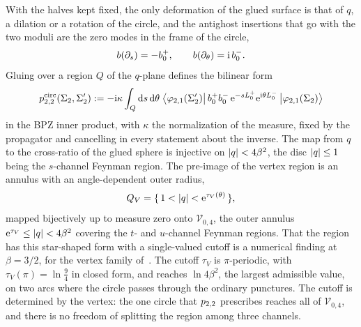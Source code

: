 With the halves kept fixed, the only deformation of the glued surface is that of $q$, a dilation or a rotation of the circle, and the antighost insertions that go with the two moduli are the zero modes in the frame of the circle,
\begin{equation}
  \label{p:eq:ws:schiffer}
  b(\partial_s)
    = - b_0^+,
  \qquad
  b(\partial_\theta)
    = \mathrm{i} \, b_0^-.
\end{equation}
Gluing over a region $Q$ of the $q$-plane defines the bilinear form
\begin{equation}
  \label{p:eq:ws:p-circ}
  p_{2,2}^{\mathrm{circ}}(\Sigma_2, \Sigma_2')
    := - \mathrm{i} \kappa \int_Q \mathrm{d} s \, \mathrm{d}\theta \;
      \big\langle \varphi_{2,1}(\Sigma_2') \big| \, b_0^+ b_0^- \, \mathrm{e}^{- s L_0^+} \mathrm{e}^{\mathrm{i} \theta L_0^-} \, \big| \varphi_{2,1}(\Sigma_2) \big\rangle
\end{equation}
in the BPZ inner product, with $\kappa$ the normalization of the measure, fixed by the propagator and cancelling in every statement about the inverse.
The map from $q$ to the cross-ratio of the glued sphere is injective on ${|q|} < 4 \beta^2$, the disc ${|q|} \le 1$ being the $s$-channel Feynman region.
The pre-image of the vertex region is an annulus with an angle-dependent outer radius,
\begin{equation}
  \label{p:eq:ws:region}
  Q_V
    = \{\, 1 < {|q|} < \mathrm{e}^{\tau_V(\theta)} \,\},
\end{equation}
mapped bijectively up to measure zero onto $\mathcal V_{0,4}$, the outer annulus $\mathrm{e}^{\tau_V} \le {|q|} < 4 \beta^2$ covering the $t$- and $u$-channel Feynman regions.
That the region has this star-shaped form with a single-valued cutoff is a numerical finding at $\beta = 3 / 2$, for the vertex family of~\cite{Erbin:2026:SL2CVerticesClosed}.
The cutoff $\tau_V$ is $\pi$-periodic, with $\tau_V(\pi) = \ln \tfrac94$ in closed form, and reaches $\ln 4 \beta^2$, the largest admissible value, on two arcs where the circle passes through the ordinary punctures.
The cutoff is determined by the vertex: the one circle that $p_{2,2}$ prescribes reaches all of $\mathcal V_{0,4}$, and there is no freedom of splitting the region among three channels.


